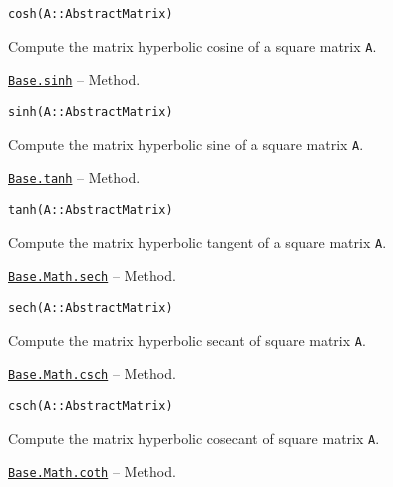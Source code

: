 \begin{adjustwidth}{2em}{0pt}


\begin{verbatim}
cosh(A::AbstractMatrix)
\end{verbatim}

Compute the matrix hyperbolic cosine of a square matrix \texttt{A}.



\end{adjustwidth}
\hypertarget{10621922578961083459}{} 
\hyperlink{10621922578961083459}{\texttt{Base.sinh}}  -- {Method.}

\begin{adjustwidth}{2em}{0pt}


\begin{verbatim}
sinh(A::AbstractMatrix)
\end{verbatim}

Compute the matrix hyperbolic sine of a square matrix \texttt{A}.



\end{adjustwidth}
\hypertarget{1859383072068909395}{} 
\hyperlink{1859383072068909395}{\texttt{Base.tanh}}  -- {Method.}

\begin{adjustwidth}{2em}{0pt}


\begin{verbatim}
tanh(A::AbstractMatrix)
\end{verbatim}

Compute the matrix hyperbolic tangent of a square matrix \texttt{A}.



\end{adjustwidth}
\hypertarget{12898765534995911506}{} 
\hyperlink{12898765534995911506}{\texttt{Base.Math.sech}}  -- {Method.}

\begin{adjustwidth}{2em}{0pt}


\begin{verbatim}
sech(A::AbstractMatrix)
\end{verbatim}

Compute the matrix hyperbolic secant of square matrix \texttt{A}.



\end{adjustwidth}
\hypertarget{14098493345003221932}{} 
\hyperlink{14098493345003221932}{\texttt{Base.Math.csch}}  -- {Method.}

\begin{adjustwidth}{2em}{0pt}


\begin{verbatim}
csch(A::AbstractMatrix)
\end{verbatim}

Compute the matrix hyperbolic cosecant of square matrix \texttt{A}.



\end{adjustwidth}
\hypertarget{2675030789857212222}{} 
\hyperlink{2675030789857212222}{\texttt{Base.Math.coth}}  -- {Method.}

